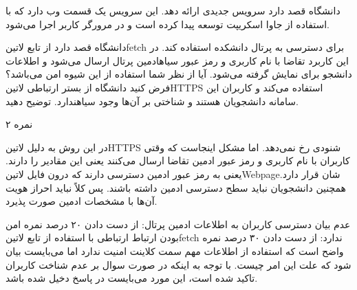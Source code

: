 \documentclass[../main.tex]{subfiles}
\begin{document}

دانشگاه قصد دارد سرویس جدیدی ارائه دهد.
این سرویس یک قسمت وب دارد که با استفاده از جاوا اسکریپت توسعه پیدا
کرده است و در مرورگر کاربر اجرا می‌شود.

دانشگاه قصد دارد از تابع ‌لاتین{fetch} برای دسترسی به پرتال دانشکده استفاده کند.
در این کاربرد تقاضا با نام کاربری و رمز عبور ‌سیاه{ادمین} پرتال ارسال می‌شود و اطلاعات دانشجو برای نمایش گرفته می‌شود.
آیا از نظر شما استفاده از این شیوه امن می‌باشد؟ فرض کنید دانشگاه از بستر ارتباطی ‌لاتین{HTTPS} استفاده می‌کند و
کاربران این سامانه دانشجویان هستند و شناختی بر آن‌ها وجود ‌سیاه{ندارد}.
توضیح دهید.

۲ نمره

\begin{answer}
در این روش به دلیل ‌لاتین{HTTPS} شنودی رخ نمی‌دهد.
اما مشکل اینجاست که وقتی کاربران با نام کاربری و رمز عبور ادمین تقاضا ارسال می‌کنند یعنی این مقادیر را دارند. یعنی به رمز عبور ادمین دسترسی دارند که درون فایل ‌لاتین{Webpage}شان قرار دارد.
همچنین دانشجویان نباید سطح دسترسی ادمین داشته باشند. پس کلاً نباید احراز هویت آن‌ها با مشخصات ادمین صورت پذیرد.

 عدم بیان دسترسی کاربران به اطلاعات ادمین پرتال: از دست دادن ۲۰ درصد نمره
 امن بودن ارتباط ارتباطی با استفاده از تابع ‌لاتین{fetch} ندارد: از دست دادن ۳۰ درصد نمره
 واضح است که استفاده از اطلاعات مهم سمت کلاینت امنیت ندارد اما می‌بایست بیان شود که علت این امر چیست.
 با توجه به اینکه در صورت سوال بر عدم شناخت کاربران تاکید شده است، این مورد می‌بایست در پاسخ دخیل شده باشد.
\end{answer}
\end{document}
